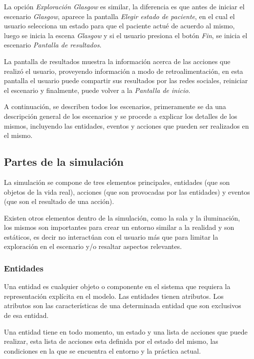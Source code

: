 La opción \emph{Exploración Glasgow} es similar, la diferencia es que antes de
iniciar el escenario \emph{Glasgow}, aparece la pantalla \emph{Elegir estado de
    paciente}, en el cual el usuario selecciona un estado para que el paciente
actué de acuerdo al mismo, luego se inicia la escena \emph{Glasgow} y si el
usuario presiona el botón \emph{Fin}, se inicia el escenario \emph{Pantalla de
    resultados}.

La pantalla de resultados muestra la información acerca de las acciones que
realizó el usuario, proveyendo información a modo de retroalimentación, en esta
pantalla el usuario puede compartir sus resultados por las redes sociales,
reiniciar el escenario y finalmente, puede volver a la \emph{Pantalla de
    inicio}.

A continuación, se describen todos los escenarios, primeramente se da una 
descripción general de los escenarios y se procede a explicar los detalles 
de los mismos, incluyendo las entidades, eventos y acciones que pueden ser realizados 
en el mismo.


\subsection{Partes de la simulación}

La simulación se compone de tres elementos principales, entidades (que son
objetos de la vida real), acciones (que son provocadas por las entidades) y
eventos (que son el resultado de una acción). 

Existen otros elementos dentro de la simulación, como la sala y la iluminación,
los mismos son importantes para crear un entorno similar a la realidad y son
estáticos, es decir no interactúan con el usuario más que para limitar la
exploración en el escenario y/o resaltar aspectos relevantes.

\subsubsection{Entidades}

Una entidad es cualquier objeto o componente en el sistema que requiera la representación
explícita en el modelo\cite{banks2000dm}. Las entidades tienen atributos. Los
atributos son las características de una determinada entidad que son exclusivos
de esa entidad.

Una entidad tiene en todo momento, un estado y una lista de acciones que
puede realizar, esta lista de acciones esta definida por el estado del mismo,
las condiciones en la que se encuentra el entorno y la práctica actual.

